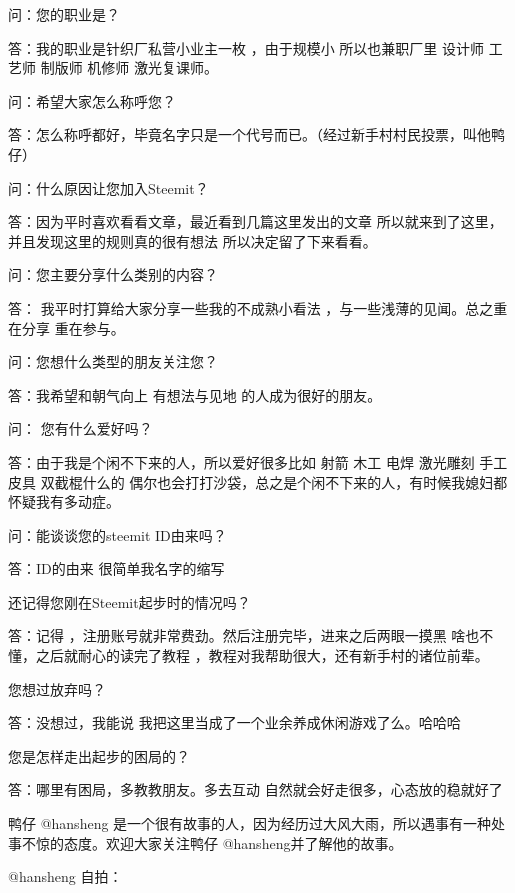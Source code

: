 \documentclass[]{ctexbook}
\begin{document}
问：您的职业是？

答：我的职业是针织厂私营小业主一枚 ，由于规模小 所以也兼职厂里 设计师 工艺师 制版师 机修师 激光复课师。

问：希望大家怎么称呼您？

答：怎么称呼都好，毕竟名字只是一个代号而已。（经过新手村村民投票，叫他鸭仔）

问：什么原因让您加入Steemit？

答：因为平时喜欢看看文章，最近看到几篇这里发出的文章 所以就来到了这里，并且发现这里的规则真的很有想法 所以决定留了下来看看。

问：您主要分享什么类别的内容？

答： 我平时打算给大家分享一些我的不成熟小看法 ，与一些浅薄的见闻。总之重在分享 重在参与。

问：您想什么类型的朋友关注您？

答：我希望和朝气向上 有想法与见地 的人成为很好的朋友。

问： 您有什么爱好吗？

答：由于我是个闲不下来的人，所以爱好很多比如 射箭 木工 电焊 激光雕刻 手工皮具 双截棍什么的 偶尔也会打打沙袋，总之是个闲不下来的人，有时候我媳妇都怀疑我有多动症。

问：能谈谈您的steemit ID由来吗？

答：ID的由来 很简单我名字的缩写

还记得您刚在Steemit起步时的情况吗？

答：记得 ，注册账号就非常费劲。然后注册完毕，进来之后两眼一摸黑 啥也不懂，之后就耐心的读完了教程 ，教程对我帮助很大，还有新手村的诸位前辈。

您想过放弃吗？

答：没想过，我能说 我把这里当成了一个业余养成休闲游戏了么。哈哈哈

您是怎样走出起步的困局的？

答：哪里有困局，多教教朋友。多去互动 自然就会好走很多，心态放的稳就好了

鸭仔 @hansheng 是一个很有故事的人，因为经历过大风大雨，所以遇事有一种处事不惊的态度。欢迎大家关注鸭仔 @hansheng并了解他的故事。

@hansheng 自拍：
\end{document}
